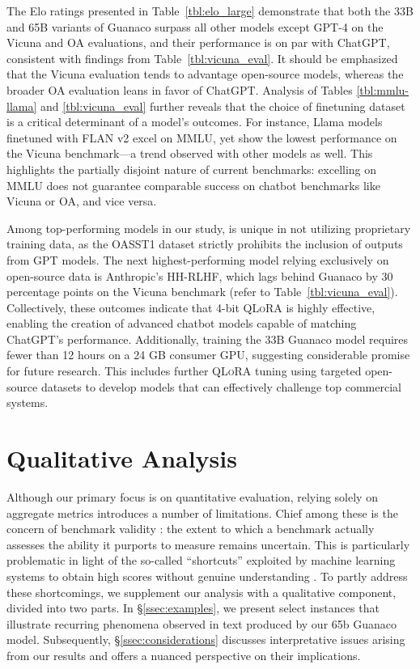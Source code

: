 The Elo ratings presented in Table~\ref{tbl:elo_large} demonstrate that both the 33B and 65B variants of {Guanaco} surpass all other models except GPT-4 on the Vicuna and OA evaluations, and their performance is on par with ChatGPT, consistent with findings from Table~\ref{tbl:vicuna_eval}. It should be emphasized that the Vicuna evaluation tends to advantage open-source models, whereas the broader OA evaluation leans in favor of ChatGPT. Analysis of Tables \ref{tbl:mmlu-llama} and \ref{tbl:vicuna_eval} further reveals that the choice of finetuning dataset is a critical determinant of a model’s outcomes. For instance, Llama models finetuned with FLAN v2 excel on MMLU, yet show the lowest performance on the Vicuna benchmark—a trend observed with other models as well. This highlights the partially disjoint nature of current benchmarks: excelling on MMLU does not guarantee comparable success on chatbot benchmarks like Vicuna or OA, and vice versa.

Among top-performing models in our study,  is unique in not utilizing proprietary training data, as the OASST1 dataset strictly prohibits the inclusion of outputs from GPT models. The next highest-performing model relying exclusively on open-source data is Anthropic’s HH-RLHF, which lags behind {Guanaco} by 30 percentage points on the Vicuna benchmark (refer to Table~\ref{tbl:vicuna_eval}). Collectively, these outcomes indicate that 4-bit \textsc{QLoRA} is highly effective, enabling the creation of advanced chatbot models capable of matching ChatGPT’s performance. Additionally, training the 33B {Guanaco} model requires fewer than 12 hours on a 24 GB consumer GPU, suggesting considerable promise for future research. This includes further \textsc{QLoRA} tuning using targeted open-source datasets to develop models that can effectively challenge top commercial systems.

\section{Qualitative Analysis}

Although our primary focus is on quantitative evaluation, relying solely on aggregate metrics introduces a number of limitations. Chief among these is the concern of benchmark validity \citep{liao2021we}: the extent to which a benchmark actually assesses the ability it purports to measure remains uncertain. This is particularly problematic in light of the so-called ``shortcuts'' exploited by machine learning systems to obtain high scores without genuine understanding \citep{gururangan2018annotation, poliak2018hypothesis}. To partly address these shortcomings, we supplement our analysis with a qualitative component, divided into two parts. In \S\ref{ssec:examples}, we present select instances that illustrate recurring phenomena observed in text produced by our 65b {Guanaco} model. Subsequently, \S\ref{ssec:considerations} discusses interpretative issues arising from our results and offers a nuanced perspective on their implications.

